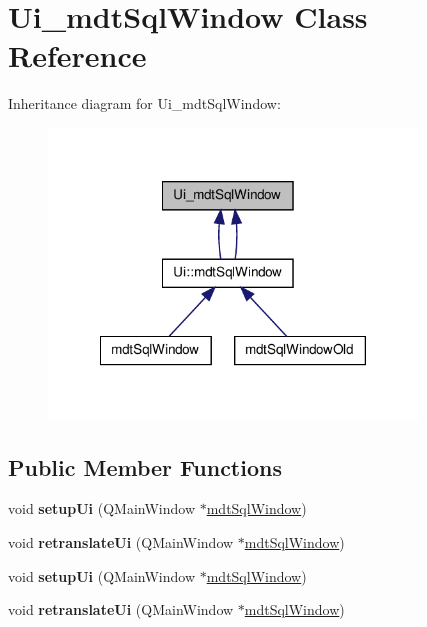 \hypertarget{class_ui__mdt_sql_window}{
\section{Ui\_\-mdtSqlWindow Class Reference}
\label{class_ui__mdt_sql_window}
}


Inheritance diagram for Ui\_\-mdtSqlWindow:\nopagebreak
\begin{figure}[H]
\begin{center}
\leavevmode
\includegraphics[width=278pt]{class_ui__mdt_sql_window__inherit__graph}
\end{center}
\end{figure}
\subsection*{Public Member Functions}
\begin{DoxyCompactItemize}
\item 
\hypertarget{class_ui__mdt_sql_window_ae239e0a0f809a87b3e9ad72df5fec637}{
void {\bfseries setupUi} (QMainWindow $\ast$\hyperlink{classmdt_sql_window}{mdtSqlWindow})}
\label{class_ui__mdt_sql_window_ae239e0a0f809a87b3e9ad72df5fec637}

\item 
\hypertarget{class_ui__mdt_sql_window_a20555e544c9d18d107ecf1a924c9ed90}{
void {\bfseries retranslateUi} (QMainWindow $\ast$\hyperlink{classmdt_sql_window}{mdtSqlWindow})}
\label{class_ui__mdt_sql_window_a20555e544c9d18d107ecf1a924c9ed90}

\item 
\hypertarget{class_ui__mdt_sql_window_ae239e0a0f809a87b3e9ad72df5fec637}{
void {\bfseries setupUi} (QMainWindow $\ast$\hyperlink{classmdt_sql_window}{mdtSqlWindow})}
\label{class_ui__mdt_sql_window_ae239e0a0f809a87b3e9ad72df5fec637}

\item 
\hypertarget{class_ui__mdt_sql_window_a20555e544c9d18d107ecf1a924c9ed90}{
void {\bfseries retranslateUi} (QMainWindow $\ast$\hyperlink{classmdt_sql_window}{mdtSqlWindow})}
\label{class_ui__mdt_sql_window_a20555e544c9d18d107ecf1a924c9ed90}

\end{DoxyCompactItemize}
